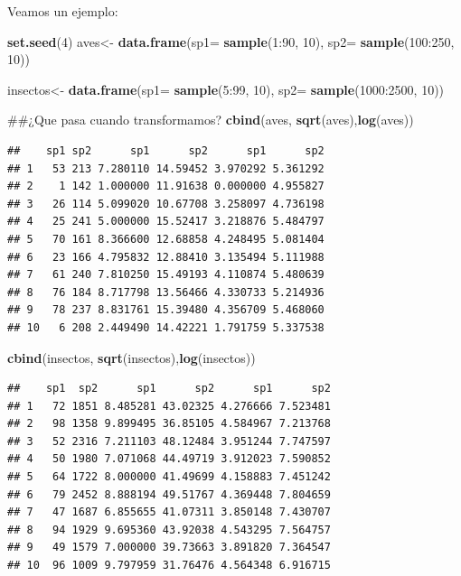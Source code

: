 \documentclass[]{book}
\newenvironment{Shaded}{\begin{snugshade}}{\end{snugshade}}
\newcommand{\KeywordTok}[1]{\textcolor[rgb]{0.13,0.29,0.53}{\textbf{{#1}}}}
\newcommand{\DataTypeTok}[1]{\textcolor[rgb]{0.13,0.29,0.53}{{#1}}}
\newcommand{\DecValTok}[1]{\textcolor[rgb]{0.00,0.00,0.81}{{#1}}}
\newcommand{\StringTok}[1]{\textcolor[rgb]{0.31,0.60,0.02}{{#1}}}
\newcommand{\NormalTok}[1]{{#1}}
\begin{document}
Veamos un ejemplo:

\begin{Shaded}
\begin{Highlighting}[]
\KeywordTok{set.seed}\NormalTok{(}\DecValTok{4}\NormalTok{)}
\NormalTok{aves<-}\StringTok{ }\KeywordTok{data.frame}\NormalTok{(}\DataTypeTok{sp1=} \KeywordTok{sample}\NormalTok{(}\DecValTok{1}\NormalTok{:}\DecValTok{90}\NormalTok{, }\DecValTok{10}\NormalTok{), }\DataTypeTok{sp2=} \KeywordTok{sample}\NormalTok{(}\DecValTok{100}\NormalTok{:}\DecValTok{250}\NormalTok{, }\DecValTok{10}\NormalTok{))}

\NormalTok{insectos<-}\StringTok{ }\KeywordTok{data.frame}\NormalTok{(}\DataTypeTok{sp1=} \KeywordTok{sample}\NormalTok{(}\DecValTok{5}\NormalTok{:}\DecValTok{99}\NormalTok{, }\DecValTok{10}\NormalTok{), }\DataTypeTok{sp2=} \KeywordTok{sample}\NormalTok{(}\DecValTok{1000}\NormalTok{:}\DecValTok{2500}\NormalTok{, }\DecValTok{10}\NormalTok{))}

\NormalTok{##¿Que pasa cuando transformamos?}
\KeywordTok{cbind}\NormalTok{(aves, }\KeywordTok{sqrt}\NormalTok{(aves),}\KeywordTok{log}\NormalTok{(aves))}
\end{Highlighting}
\end{Shaded}

\begin{verbatim}
##    sp1 sp2      sp1      sp2      sp1      sp2
## 1   53 213 7.280110 14.59452 3.970292 5.361292
## 2    1 142 1.000000 11.91638 0.000000 4.955827
## 3   26 114 5.099020 10.67708 3.258097 4.736198
## 4   25 241 5.000000 15.52417 3.218876 5.484797
## 5   70 161 8.366600 12.68858 4.248495 5.081404
## 6   23 166 4.795832 12.88410 3.135494 5.111988
## 7   61 240 7.810250 15.49193 4.110874 5.480639
## 8   76 184 8.717798 13.56466 4.330733 5.214936
## 9   78 237 8.831761 15.39480 4.356709 5.468060
## 10   6 208 2.449490 14.42221 1.791759 5.337538
\end{verbatim}

\begin{Shaded}
\begin{Highlighting}[]
\KeywordTok{cbind}\NormalTok{(insectos, }\KeywordTok{sqrt}\NormalTok{(insectos),}\KeywordTok{log}\NormalTok{(insectos))}
\end{Highlighting}
\end{Shaded}

\begin{verbatim}
##    sp1  sp2      sp1      sp2      sp1      sp2
## 1   72 1851 8.485281 43.02325 4.276666 7.523481
## 2   98 1358 9.899495 36.85105 4.584967 7.213768
## 3   52 2316 7.211103 48.12484 3.951244 7.747597
## 4   50 1980 7.071068 44.49719 3.912023 7.590852
## 5   64 1722 8.000000 41.49699 4.158883 7.451242
## 6   79 2452 8.888194 49.51767 4.369448 7.804659
## 7   47 1687 6.855655 41.07311 3.850148 7.430707
## 8   94 1929 9.695360 43.92038 4.543295 7.564757
## 9   49 1579 7.000000 39.73663 3.891820 7.364547
## 10  96 1009 9.797959 31.76476 4.564348 6.916715
\end{verbatim}
\end{document}

